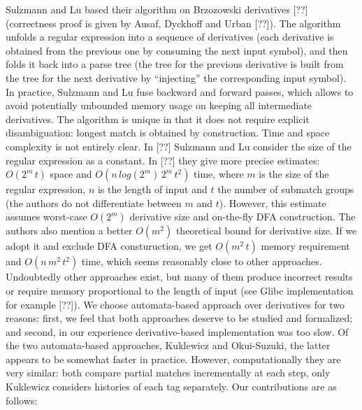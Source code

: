 \documentclass[AMA,STIX1COL]{WileyNJD-v2}
\begin{document}
Sulzmann and Lu based their algorithm on Brzozowski derivatives [??]
(correctness proof is given by Ausaf, Dyckhoff and Urban [??]).
The algorithm unfolds a regular expression into a sequence of derivatives
(each derivative is obtained from the previous one by consuming the next input symbol),
and then folds it back into a parse tree
(the tree for the previous derivative is built from the tree for the next derivative by ``injecting'' the corresponding input symbol).
In practice, Sulzmann and Lu fuse backward and forward passes,
which allows to avoid potentially unbounded memory usage on keeping all intermediate derivatives.
The algorithm is unique in that it does not require explicit disambiguation: longest match is obtained by construction.
Time and space complexity is not entirely clear.
In [??] Sulzmann and Lu consider the size of the regular expression as a constant.
In [??] they give more precise estimates: $O(2^m \, t)$ space and $O(n \, log(2^m) \, 2^m \, t^2)$ time,
where $m$ is the size of the regular expression,
$n$ is the length of input
and $t$ the number of submatch groups (the authors do not differentiate between $m$ and $t$).
However, this estimate assumes worst-case $O(2^m)$ derivative size and on-the-fly DFA construction.
The authors also mention a better $O(m^2)$ theoretical bound for derivative size.
If we adopt it and exclude DFA consturuction, we get $O(m^2 \, t)$ memory requirement and $O(n \, m^2 \, t^2)$ time,
which seems reasonably close to other approaches.
\\

Undoubtedly other approaches exist,
but many of them produce incorrect results or require memory proportional to the length of input
(see Glibc implementation for example [??]).
We choose automata-based approach over derivatives for two reasons:
first, we feel that both approaches deserve to be studied and formalized;
and second, in our experience derivative-based implementation was too slow.
Of the two automata-based approaches, Kuklewicz and Okui-Suzuki, the latter appears to be somewhat faster in practice.
However, computationally they are very similar:
both compare partial matches incrementally at each step,
only Kuklewicz considers histories of each tag separately.
Our contributions are as follows:
\\
\end{document}
